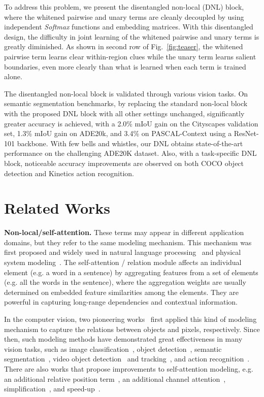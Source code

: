 \documentclass[runningheads]{llncs}
\begin{document}
To address this problem, we present the disentangled non-local (DNL) block, where the whitened pairwise and unary terms are cleanly decoupled by using independent \textit{Softmax} functions and embedding matrices. With this disentangled design, the difficulty in joint learning of the whitened pairwise and unary terms is greatly diminished. As shown in second row of Fig.~\ref{fig:teaser}, the whitened pairwise term learns clear within-region clues while the unary term learns salient boundaries, even more clearly than what is learned when each term is trained alone.

The disentangled non-local block is validated through various vision tasks. On semantic segmentation benchmarks, by replacing the standard non-local block with the proposed DNL block with all other settings unchanged, significantly greater accuracy is achieved, with a 2.0\% mIoU gain on the Cityscapes validation set, 1.3\% mIoU gain on ADE20k, and 3.4\% on PASCAL-Context using a ResNet-101 backbone. With few bells and whistles, our DNL obtains state-of-the-art performance on the challenging ADE20K dataset. Also, with a task-specific DNL block, noticeable accuracy improvements are observed on both COCO object detection and Kinetics action recognition.

\section{Related Works}

\noindent \textbf{Non-local/self-attention.} These terms may appear in different application domains, but they refer to the same modeling mechanism. This mechanism was first proposed and widely used in natural language processing~\cite{britz2017massive,vaswani2017attention} and physical system modeling~\cite{watters2017visual,hoshen2017vain,santoro2017simple}. The self-attention / relation module affects an individual element (e.g. a word in a sentence) by aggregating features from a set of elements (e.g. all the words in the sentence), where the aggregation weights are usually determined on embedded feature similarities among the elements. They are powerful in capturing long-range dependencies and contextual information.

In the computer vision, two pioneering works~\cite{hu2017relation,wang2018non} first applied this kind of modeling mechanism to capture the relations between objects and pixels, respectively.
Since then, such modeling methods have demonstrated great effectiveness in many vision tasks, such as image classification~\cite{hu2019local}, object detection~\cite{hu2017relation,gu2018learning}, semantic segmentation~\cite{yuan2018ocnet}, video object detection~\cite{Deng_2019_ICCV,Wu_2019_ICCV,Guo_2019_ICCV,Chen_2020_CVPR} and tracking~\cite{Xu_2019_ICCV}, and action recognition~\cite{wang2018non}. There are also works that propose improvements to self-attention modeling, e.g. an additional relative position term~\cite{hu2017relation,hu2019local}, an additional channel attention~\cite{jun2019danet}, simplification~\cite{cao2019gcnet}, and speed-up~\cite{huang2019ccnet}.
\end{document}
